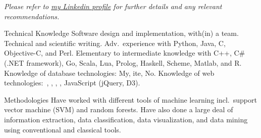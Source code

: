 \documentclass[10pt,a4paper]{article}
\begin{document}
\begin{center}
\textit{Please refer to \href{http://ca.linkedin.com/in/asafatli}{my Linkedin profile} for further details and any relevant recommendations.}
\end{center}

\spacedhrule{-0.2em}{-0.4em} %



\nocite{Latent2012}
\nocite{DCSI2012}
\nocite{Ref2013}
\nocite{Lisbon2015}
\nocite{Pylogeny}
\printbibliography[heading=none]

\spacedhrule{0.5em}{-0.4em} %





\spacedhrule{0.5em}{-0.4em} %



\inlineheadsection
{Technical Knowledge}
{Software design and implementation, with(in) a team. Technical and scientific writing. Adv.\ experience with Python, Java, C, Objective-C, and Perl. Elementary to intermediate knowledge with C++, C\# (.NET framework), Go, Scala, Lua, Prolog, Haskell, Scheme, Matlab, and R. Knowledge of database technologies: My, ite, No. Knowledge of web technologies:\ , , , , JavaScript (jQuery, D3).}

\inlineheadsection 
{Methodologies}
{Have worked with different tools of machine learning incl.\ support vector machine (SVM) and random forests. Have also done a large deal of information extraction, data classification, data visualization, and data mining using conventional and classical tools.}
\end{document}
